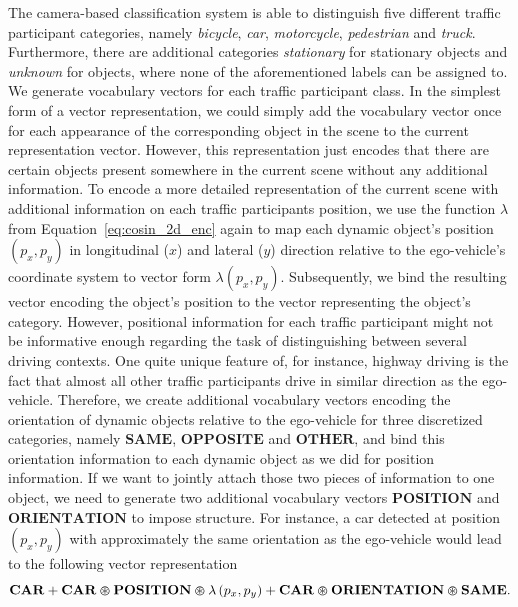 The camera-based classification system is able to distinguish five different traffic participant categories, namely \emph{bicycle}, \emph{car}, \emph{motorcycle}, \emph{pedestrian} and \emph{truck}.
Furthermore, there are additional categories \emph{stationary} for stationary objects and \emph{unknown} for objects, where none of the aforementioned labels can be assigned to.
We generate vocabulary vectors for each traffic participant class.
In the simplest form of a vector representation, we could simply add the vocabulary vector once for each appearance of the corresponding object in the scene to the current representation vector. 
However, this representation just encodes that there are certain objects present somewhere in the current scene without any additional information.
To encode a more detailed representation of the current scene with additional information on each traffic participants position, we use the function $\lambda$ from Equation~\eqref{eq:cosin_2d_enc} again to map each dynamic object's position $(p_x, p_y)$ in longitudinal ($x$) and lateral ($y$) direction relative to the ego-vehicle's coordinate system to vector form $ \lambda(p_x, p_y)$.
Subsequently, we bind the resulting vector encoding the object's position to the vector representing the object's category.
However, positional information for each traffic participant might not be informative enough regarding the task of distinguishing between several driving contexts.
One quite unique feature of, for instance, highway driving is the fact that almost all other traffic participants drive in similar direction as the ego-vehicle.
Therefore, we create additional vocabulary vectors encoding the orientation of dynamic objects relative to the ego-vehicle for three discretized categories, namely $\mathbf{SAME}$, $\mathbf{OPPOSITE}$ and $\mathbf{OTHER}$, and  bind this orientation information to each dynamic object as we did for position information.
If we want to jointly attach those two pieces of information to one object, we need to generate two additional vocabulary vectors $\mathbf{POSITION}$ and $\mathbf{ORIENTATION }$ to impose structure.
For instance, a car detected at position $\left(p_x,p_y\right)$ with approximately the same orientation as the ego-vehicle would lead to the following vector representation
\begin{equation}
\label{eq:pos_orientation_context_class}
\mathbf{CAR} + \mathbf{CAR}\varoast\mathbf{POSITION}\varoast\lambda\left(p_x,p_y\right) + \mathbf{CAR}\varoast\mathbf{ORIENTATION}\varoast\mathbf{SAME}.
\end{equation}

